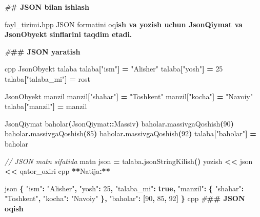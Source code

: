 \documentclass[a4paper,11pt,twoside,openright]{book}
\newenvironment{Shaded}{\begin{snugshade}}{\end{snugshade}}
\newcommand{\CharTok}[1]{\textcolor[rgb]{0.31,0.60,0.02}{#1}}
\newcommand{\CommentTok}[1]{\textcolor[rgb]{0.56,0.35,0.01}{\textit{#1}}}
\newcommand{\DecValTok}[1]{\textcolor[rgb]{0.00,0.00,0.81}{#1}}
\newcommand{\ErrorTok}[1]{\textcolor[rgb]{0.64,0.00,0.00}{\textbf{#1}}}
\newcommand{\KeywordTok}[1]{\textcolor[rgb]{0.13,0.29,0.53}{\textbf{#1}}}
\newcommand{\NormalTok}[1]{#1}
\newcommand{\OperatorTok}[1]{\textcolor[rgb]{0.81,0.36,0.00}{\textbf{#1}}}
\newcommand{\PreprocessorTok}[1]{\textcolor[rgb]{0.56,0.35,0.01}{\textit{#1}}}
\newcommand{\StringTok}[1]{\textcolor[rgb]{0.31,0.60,0.02}{#1}}
\begin{document}
\begin{Shaded}
\begin{Highlighting}[]
\PreprocessorTok{\#}\ErrorTok{\# JSON bilan ishlash}

\ErrorTok{\textasciigrave{}}\NormalTok{fayl\_tizimi}\OperatorTok{.}\NormalTok{hpp}\ErrorTok{\textasciigrave{}}\NormalTok{ JSON formatini o}\CharTok{\textquotesingle{}q}\ErrorTok{ish va yozish uchun \textasciigrave{}JsonQiymat\textasciigrave{} va \textasciigrave{}JsonObyekt\textasciigrave{} sinflarini taqdim etadi.}

\PreprocessorTok{\#}\ErrorTok{\#\# JSON yaratish}

\ErrorTok{\textasciigrave{}\textasciigrave{}\textasciigrave{}}\NormalTok{cpp}
\NormalTok{JsonObyekt talaba}
\NormalTok{talaba}\OperatorTok{[}\StringTok{"ism"}\OperatorTok{]} \OperatorTok{=} \StringTok{"Alisher"}
\NormalTok{talaba}\OperatorTok{[}\StringTok{"yosh"}\OperatorTok{]} \OperatorTok{=} \DecValTok{25}
\NormalTok{talaba}\OperatorTok{[}\StringTok{"talaba\_mi"}\OperatorTok{]} \OperatorTok{=}\NormalTok{ rost}

\NormalTok{JsonObyekt manzil}
\NormalTok{manzil}\OperatorTok{[}\StringTok{"shahar"}\OperatorTok{]} \OperatorTok{=} \StringTok{"Toshkent"}
\NormalTok{manzil}\OperatorTok{[}\StringTok{"kocha"}\OperatorTok{]} \OperatorTok{=} \StringTok{"Navoiy"}
\NormalTok{talaba}\OperatorTok{[}\StringTok{"manzil"}\OperatorTok{]} \OperatorTok{=}\NormalTok{ manzil}

\NormalTok{JsonQiymat baholar}\OperatorTok{(}\NormalTok{JsonQiymat}\OperatorTok{::}\NormalTok{Massiv}\OperatorTok{)}
\NormalTok{baholar}\OperatorTok{.}\NormalTok{massivgaQoshish}\OperatorTok{(}\DecValTok{90}\OperatorTok{)}
\NormalTok{baholar}\OperatorTok{.}\NormalTok{massivgaQoshish}\OperatorTok{(}\DecValTok{85}\OperatorTok{)}
\NormalTok{baholar}\OperatorTok{.}\NormalTok{massivgaQoshish}\OperatorTok{(}\DecValTok{92}\OperatorTok{)}
\NormalTok{talaba}\OperatorTok{[}\StringTok{"baholar"}\OperatorTok{]} \OperatorTok{=}\NormalTok{ baholar}

\CommentTok{// JSON matn sifatida}
\NormalTok{matn json }\OperatorTok{=}\NormalTok{ talaba}\OperatorTok{.}\NormalTok{jsonStringKilish}\OperatorTok{()}
\NormalTok{yozish }\OperatorTok{\textless{}\textless{}}\NormalTok{ json }\OperatorTok{\textless{}\textless{}}\NormalTok{ qator\_oxiri}
\ErrorTok{\textasciigrave{}\textasciigrave{}\textasciigrave{}}\NormalTok{cpp}
\OperatorTok{**}\NormalTok{Natija}\OperatorTok{:**}

\ErrorTok{\textasciigrave{}\textasciigrave{}\textasciigrave{}}\NormalTok{json}
\OperatorTok{\{}
  \StringTok{"ism"}\OperatorTok{:} \StringTok{"Alisher"}\OperatorTok{,}
  \StringTok{"yosh"}\OperatorTok{:} \DecValTok{25}\OperatorTok{,}
  \StringTok{"talaba\_mi"}\OperatorTok{:} \KeywordTok{true}\OperatorTok{,}
  \StringTok{"manzil"}\OperatorTok{:} \OperatorTok{\{}
    \StringTok{"shahar"}\OperatorTok{:} \StringTok{"Toshkent"}\OperatorTok{,}
    \StringTok{"kocha"}\OperatorTok{:} \StringTok{"Navoiy"}
  \OperatorTok{\},}
  \StringTok{"baholar"}\OperatorTok{:} \OperatorTok{[}\DecValTok{90}\OperatorTok{,} \DecValTok{85}\OperatorTok{,} \DecValTok{92}\OperatorTok{]}
\OperatorTok{\}}
\ErrorTok{\textasciigrave{}\textasciigrave{}\textasciigrave{}}\NormalTok{cpp}
\PreprocessorTok{\#}\ErrorTok{\#\# JSON o\textquotesingle{}qish}


\end{Highlighting}
\end{Shaded}
\end{document}
